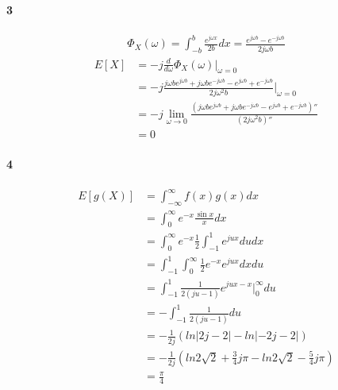 \documentclass[22pt]{article}
\begin{document}
    \paragraph{3} 
    \begin{align}
    \Phi_X(\omega) = \int_{-b}^{b}\frac{e^{j \omega x}}{2b} dx = \frac{e^{j \omega b}-e^{-j \omega b}}{2j \omega b}
    \end{align}
    \begin{align}
    E[X]&= -j\frac{d}{d \omega}\Phi_X(\omega)|_{\omega = 0} \\
    & = -j\frac{j \omega b e^{j \omega b}+j \omega be^{-j \omega b}-e^{j \omega b}+e^{-j \omega b}}{2j \omega^2 b}|_{\omega=0}\\
    & = -j\lim_{\omega \rightarrow 0}\frac{(j \omega b e^{j \omega b}+j \omega be^{-j \omega b}-e^{j \omega b}+e^{-j \omega b})''}{(2j \omega^2 b)''}\\
    & = 0
    \end{align}


    \paragraph{4}
    \begin{align}
    E[g(X)] & = \int_{-\infty}^{\infty} f(x)g(x) dx\\
    & = \int_{0}^{\infty} e^{-x}\frac{\sin x}{x}  dx\\
    & = \int_{0}^{\infty} e^{-x}\frac{1}{2}\int_{-1}^{1}e^{jux} dudx\\
    & = \int_{-1}^{1}\int_{0}^{\infty}\frac{1}{2}e^{-x}e^{jux}dx du\\
    & = \int_{-1}^{1} \frac{1}{2(ju-1)}e^{jux-x}|^{\infty}_{0} du\\
    & = -\int_{-1}^{1} \frac{1}{2(ju-1)} du\\
    & = - \frac{1}{2j}(ln|2j-2|-ln|-2j-2|)\\
    & = - \frac{1}{2j}(ln2\sqrt{2} + \frac{3}{4}j \pi -ln2\sqrt{2} - \frac{5}{4}j \pi)\\
    & = \frac{\pi}{4		}
    \end{align}
\end{document}

